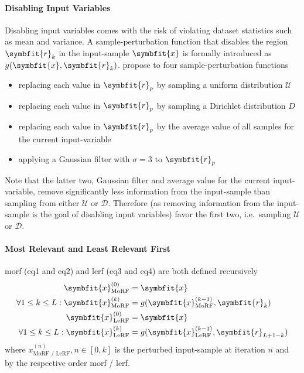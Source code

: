 \paragraph{Disabling Input Variables}
Disabling input variables comes with the risk of violating dataset statistics such as mean and variance. A sample-perturbation function that disables the region \(\symbfit{r}_k\) in the input-sample \(\symbfit{x}\) is formally introduced as \(g(\symbfit{x}, \symbfit{r}_k)\). \citeauthor{WojciechSamek.2015} propose to four sample-perturbation functions
\begin{itemize}
    \item replacing each value in \(\symbfit{r}_p\) by sampling a uniform distribution \(\mathscr U\)
    \item replacing each value in \(\symbfit{r}_p\) by sampling a Dirichlet distribution \(D\)
    \item replacing each value in \(\symbfit{r}_p\) by the average value of all samples for the current input-variable
    \item applying a Gaussian filter with \(\sigma = 3\) to \(\symbfit{r}_p\)
\end{itemize}
Note that the latter two, Gaussian filter and average value for the current input-variable, remove significantly less information from the input-sample than sampling from either \(\mathscr U\) or \(\mathscr D\).  Therefore (as removing information from the input-sample is the goal of disabling input variables) \citeauthor{WojciechSamek.2015} favor the first two, i.e.\ sampling \(\mathscr U\) or \(\mathscr D\).


\paragraph{Most Relevant and Least Relevant First}
\gls{morf} (eq1 and eq2) and \gls{lerf} (eq3 and eq4) are both defined recursively 
\begin{align}
    \symbfit{x}^{(0)}_{\text{MoRF}} &= \symbfit{x} \\
    \forall{1 \leq k \leq L}: \symbfit{x}^{(k)}_{\text{MoRF}} &= g(\symbfit{x}^{(k-1)}_{\text{MoRF}}, \symbfit{r}_k) \\
    \symbfit{x}^{(0)}_{\text{LeRF}} &= \symbfit{x} \\
    \forall{1 \leq k \leq L}: \symbfit{x}^{(k)}_{\text{LeRF}} &= g(\symbfit{x}^{(k-1)}_{\text{LeRF}}, \symbfit{r}_{L+1-k})
\end{align}
where \(x^{(n)}_{\text{MoRF / LeRF}}, n \in [0, k]\) is the perturbed input-sample at iteration \(n\) and by the respective order \gls{morf} / \gls{lerf}.

